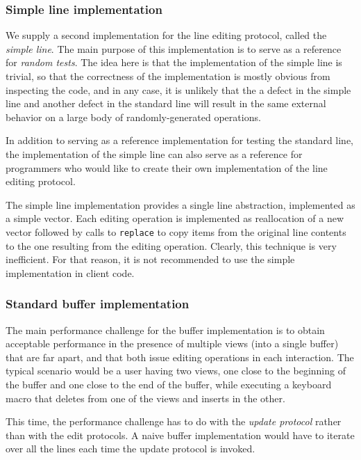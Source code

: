 \subsubsection{Simple line implementation}

We supply a second implementation for the line editing protocol,
called the \emph{simple line}.  The main purpose of this
implementation is to serve as a reference for \emph{random tests}.
The idea here is that the implementation of the simple line is
trivial, so that the correctness of the implementation is mostly
obvious from inspecting the code, and in any case, it is unlikely that
the a defect in the simple line and another defect in the standard
line will result in the same external behavior on a large body of
randomly-generated operations.

In addition to serving as a reference implementation for testing the
standard line, the implementation of the simple line can also serve as
a reference for programmers who would like to create their own
implementation of the line editing protocol.

The simple line implementation provides a single line abstraction,
implemented as a \commonlisp{} simple vector.  Each editing operation
is implemented as reallocation of a new vector followed by calls to
\texttt{replace} to copy items from the original line contents to the
one resulting from the editing operation.  Clearly, this technique is
very inefficient.  For that reason, it is not recommended to use the
simple implementation in client code.

\subsubsection{Standard buffer implementation}

The main performance challenge for the buffer implementation is to
obtain acceptable performance in the presence of multiple views (into
a single buffer) that are far apart, and that both issue editing
operations in each interaction.  The typical scenario would be a user
having two views, one close to the beginning of the buffer and one
close to the end of the buffer, while executing a keyboard macro that
deletes from one of the views and inserts in the other.

This time, the performance challenge has to do with the \emph{update
  protocol} rather than with the edit protocols.  A naive buffer
implementation would have to iterate over all the lines each time the
update protocol is invoked.

